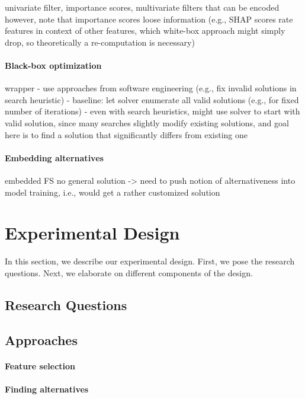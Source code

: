 \documentclass{article}
\theoremstyle{definition}
\begin{document}
univariate filter, importance scores, multivariate filters that can be encoded
however, note that importance scores loose information (e.g., SHAP scores rate features in context of other features, which white-box approach might simply drop, so theoretically a re-computation is necessary)

\paragraph{Black-box optimization}

wrapper
- use approaches from software engineering (e.g., fix invalid solutions in search heuristic)
- baseline: let solver enumerate all valid solutions (e.g., for fixed number of iterations)
- even with search heuristics, might use solver to start with valid solution, since many searches slightly modify existing solutions, and goal here is to find a solution that significantly differs from existing one

\paragraph{Embedding alternatives}

embedded FS
no general solution -> need to push notion of alternativeness into model training, i.e., would get a rather customized solution

\section{Experimental Design}
\label{sec:experimental-design}

In this section, we describe our experimental design.
First, we pose the research questions.
Next, we elaborate on different components of the design.

\subsection{Research Questions}

\subsection{Approaches}

\paragraph{Feature selection}

\paragraph{Finding alternatives}
\end{document}
